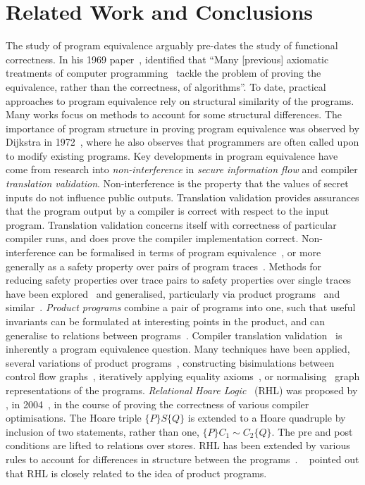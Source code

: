 \documentclass[runningheads,a4paper]{llncs}
\begin{document}
\section{Related Work and Conclusions}\label{sec:related}
The study of program equivalence arguably pre-dates the study of functional correctness. In his 1969 paper~\cite{Hoare1969}, \citeauthor{Hoare1969} identified that ``Many [previous] axiomatic treatments of computer programming~\cite{Yanov1958,Igarishi1964,DeBarker1968} tackle the problem of proving the equivalence, rather than the correctness, of algorithms''. To date, practical approaches to program equivalence rely on structural similarity of the programs. Many works focus on methods to account for some structural differences. The importance of program structure in proving program equivalence was observed by Dijkstra in 1972~\cite{Dahl1972}, where he also observes that programmers are often called upon to modify existing programs.
Key developments in program equivalence have come from research into \emph{non-interference} in \emph{secure information flow} and compiler \emph{translation validation}. Non-interference is the property that the values of secret inputs do not influence public outputs. Translation validation provides assurances that the program output by a compiler is correct with respect to the input program. Translation validation concerns itself with correctness of particular compiler runs, and does prove the compiler implementation correct.
Non-interference can be formalised in terms of program equivalence~\cite{Joshi2000}, or more generally as a safety property over pairs of program traces~\cite{Barthe2004,Terauchi2005}.  Methods for reducing safety properties over trace pairs to safety properties over single traces have been explored~\cite{Leino2008a,Benton2006} and generalised, particularly via product programs~\cite{Barthe2011,Barthe2013} and similar~\cite{Zaks2008,Stepp11,Tristan11}. \emph{Product programs} combine a pair of programs into one, such that useful invariants can be formulated at interesting points in the product, and can generalise to relations between programs~\cite{Barthe2016}. 
Compiler translation validation~\cite{Kundu09,Stepp11,Tristan11,Le2014,Zaks2008} is inherently a program equivalence question. Many techniques have been applied, several variations of product programs~\cite{Zaks2008}, constructing bisimulations between control flow graphs~\cite{Kundu09}, iteratively applying equality axioms~\cite{Stepp11}, or normalising~\cite{Tristan11} graph representations of the programs.
\emph{Relational Hoare Logic}~\cite{Benton2004,Benton2007,Yang2007,Beringer2011,Barthe2016} (RHL) was proposed by \citeauthor{Benton2004}, in 2004~\cite{Benton2004}, in the course of proving the correctness of various compiler optimisations. The Hoare triple $\{P\} S \{Q\}$ is extended to a Hoare quadruple by inclusion of two statements, rather than one, $\{P\} C_1 \sim C_2 \{Q\}$. The pre and post conditions are lifted to relations over stores. RHL has been extended by various rules to account for differences in structure between the programs~\cite{Benton2004,Barthe2016}. \citeauthor{Barthe2016}~\cite{Barthe2016} pointed out that RHL is closely related to the idea of product programs. 
\end{document}

